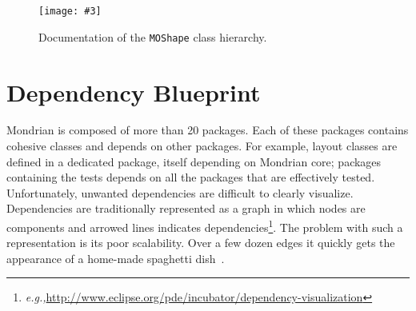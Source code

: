 \documentclass[runningheads]{llncs}
\newcommand{\ct}{\lstinline[backgroundcolor=\color{white},basicstyle=\footnotesize\ttfamily]}
\newcommand{\largefig}[4]{
	\begin{figure*}[#1]
		\centering
		\texttt{[image: \#3]}
		\caption{\label{fig:#3}#4}
	\end{figure*}}
\newcommand{\eg}{\emph{e.g.,}\xspace}
\newcommand{\seclabel}[1]{\label{sec:#1}}
\newcommand{\figref}[1]{Figure~\ref{fig:#1}}
\newcommand{\tablabel}[1]{\label{tab:#1}}
\begin{document}
%
%

\largefig{}{1.0}{DocumentationBlueprintEvolution}{Documentation of the \ct{MOShape} class hierarchy.}

\section{Dependency Blueprint}\seclabel{dependencyblueprint}

Mondrian is composed of more than 20 packages. Each of these packages contains cohesive classes and depends on other packages. For example, layout classes are defined in a dedicated package, itself depending on Mondrian core; packages containing the tests depends on all the packages that are effectively tested. Unfortunately, unwanted dependencies are difficult to clearly visualize.
Dependencies are traditionally represented as a graph in which nodes are components and arrowed lines indicates dependencies\footnote{\eg \url{http://www.eclipse.org/pde/incubator/dependency-visualization}}. The problem with such a representation is its poor scalability. Over a few dozen edges it quickly gets the appearance of a home-made spaghetti dish~\cite{Tele10a}. 
\end{document}
